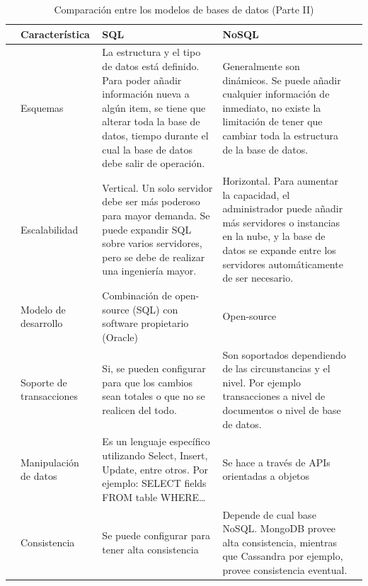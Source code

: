 \begin{table}[H]\centering
	
	\caption{Comparación entre los modelos de bases de datos (Parte II)}
	\label{basesDeDatos2}
	
	\begin{tabular}{@{}cC{3cm}C{5cm}C{5cm}c@{}}\toprule
		
	& Característica & SQL & NoSQL &\\ \midrule
	
	& Esquemas & La estructura y el tipo de datos está definido. Para poder añadir información nueva a algún item, se tiene que alterar toda la base de datos, tiempo durante el cual la base de datos debe salir de operación. & Generalmente son dinámicos. Se puede añadir cualquier información de inmediato, no existe la limitación de tener que cambiar toda la estructura de la base de datos. &\\ \hline
	
	& Escalabilidad & Vertical. Un solo servidor debe ser más poderoso para mayor demanda. Se puede expandir SQL sobre varios servidores, pero se debe de realizar una ingeniería mayor. & Horizontal. Para aumentar la capacidad, el administrador puede añadir más servidores o instancias en la nube, y la base de datos se expande entre los servidores automáticamente de ser necesario.&\\ \hline
	
	& Modelo de desarrollo & Combinación de open-source (SQL) con software propietario (Oracle) & Open-source &\\ \hline
	
	& Soporte de transacciones & Si, se pueden configurar para que los cambios sean totales o que no se realicen del todo. & Son soportados dependiendo de las circunstancias y el nivel. Por ejemplo transacciones a nivel de documentos o nivel de base de datos. &\\ \hline
	
	& Manipulación de datos & Es un lenguaje específico utilizando Select, Insert, Update, entre otros. Por ejemplo: SELECT fields FROM table WHERE… & Se hace a través de APIs orientadas a objetos &\\ \hline
	
	& Consistencia & Se puede configurar para tener alta consistencia & Depende de cual base NoSQL. MongoDB provee alta consistencia, mientras que Cassandra por ejemplo, provee consistencia eventual. &\\ 
	
	\bottomrule
	
\end{tabular}

\end{table}


